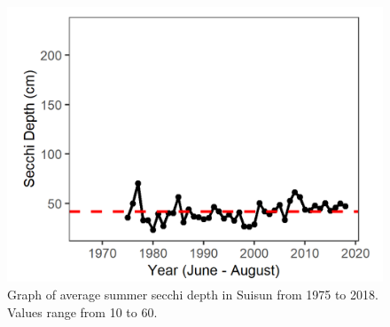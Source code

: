 \documentclass[
]{book}
\begin{document}
\begin{panel-grid}
\begin{columns-nocenter}
\begin{column800}
\begin{expand}
\end{expand}

\end{column800}

\begin{column40}

~

\end{column40}

\begin{column800}

\begin{expand}

\begin{figure}
\includegraphics[width=15.25in]{figures/secchi_sssummer} \caption{Graph of average summer secchi depth in Suisun from 1975 to 2018. Values range from 10 to 60.}\label{fig:unnamed-chunk-52}
\end{figure}

\end{expand}

\end{column800}

\begin{column40}

~

\end{column40}

\begin{column800}

\begin{expand}


\end{expand}
\end{column800}
\end{columns-nocenter}
\end{panel-grid}
\end{document}
